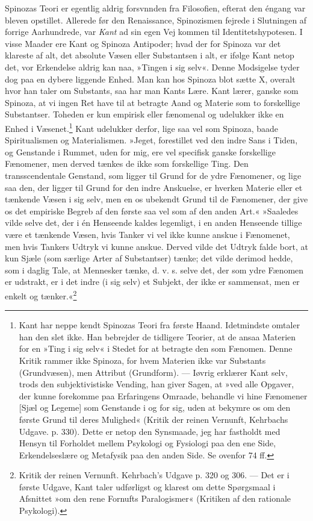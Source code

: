 \documentclass[12pt,a4paper,openany]{book}
\newcommand{\opage}[1]{\marginnote{\footnotesize\textit{[#1]}}}
\begin{document}
Spinozas Teori er egentlig aldrig forsvnnden fra Filosofien, efterat den
éngang var bleven opstillet. Allerede før den Renaissance, Spinozismen
fejrede i Slutningen af forrige Aarhundrede, var \emph{Kant} ad sin egen
Vej kommen til Identitetshypotesen. I visse Maader ere Kant og Spinoza
Antipoder; hvad der for Spinoza var det klareste af alt, det absolute
Væsen eller Substantsen i alt, er ifølge Kant netop det, vor Erkendelse
aldrig kan naa, »Tingen i sig selv«. Denne Modsigelse tyder dog paa en
dybere liggende Enhed. Man kan hos Spinoza blot sætte X, overalt hvor
han taler om Substants, saa har man Kants Lære. Kant lærer, ganske som
\opage{82}Spinoza, at vi ingen Ret have til at betragte Aand og Materie
som to forskellige Substantser. Toheden er kun empirisk eller fænomenal
og udelukker ikke en Enhed i Væsenet.\footnote[1]{Kant har neppe kendt
Spinozas Teori fra første Haand. Idetmindste omtaler han den slet ikke.
Han bebrejder de tidligere Teorier, at de ansaa Materien for en »Ting i
sig selv« i Stedet for at betragte den som Fænomen. Denne Kritik rammer
ikke Spinoza, for hvem Materien ikke var Substants (Grundvæsen), men
Attribut (Grundform). --- Iøvrig erklærer Kant selv, trods den
subjektivistiske Vending, han giver Sagen, at »ved alle Opgaver, der
kunne forekomme paa Erfaringens Omraade, behandle vi hine Fænomener
[Sjæl og Legeme] som Genstande i og for sig, uden at bekymre os om den
første Grund til deres Mulighed« (Kritik der reinen Vernunft, Kehrbachs
Udgave. p. 330). Dette er netop den Synsmaade, jeg har fastholdt med
Hensyn til Forholdet mellem Psykologi og Fysiologi paa den ene Side,
Erkendelseslære og Metafysik paa den anden Side. Se ovenfor 74 ff.} Kant
udelukker derfor, lige saa vel som Spinoza, baade Spiritualismen og
Materialismen. »Jeget, forestillet ved den indre Sans i Tiden, og
Genstande i Rummet, uden for mig, ere vel specifisk ganske forskellige
Fænomener, men derved tænkes de ikke som forskellige Ting. Den
transscendentale Genstand, som ligger til Grund for de ydre Fænomener,
og lige saa den, der ligger til Grund for den indre Anskuelse, er
hverken Materie eller et tænkende Væsen i sig selv, men en os ubekendt
Grund til de Fænomener, der give os det empiriske Begreb af den første
saa vel som af den anden Art.« »Saaledes vilde selve det, der i én
Henseende kaldes legemligt, i en anden Henseende tillige være et
tænkende Væsen, hvis Tanker vi vel ikke kunne anskue i Fænomenet, men
hvis Tankers Udtryk vi kunne anskue. Derved vilde det Udtryk falde bort,
at kun Sjæle (som særlige Arter af Substantser) tænke; det vilde derimod
hedde, som i daglig Tale, at Mennesker tænke, d. v. s. selve det, der
som ydre Fænomen er udstrakt, er i det indre (i sig selv) et Subjekt,
der ikke er sammensat, men er enkelt og tænker.«\footnote[2]{Kritik der
reinen Vernunft. Kehrbach’s Udgave p. 320 og 306. --- Det er i første
Udgave, Kant taler udførligst og klarest om dette Spørgsmaal i Afsnittet
»om den rene Fornufts Paralogismer« (Kritiken af den rationale
Psykologi).}
\end{document}
